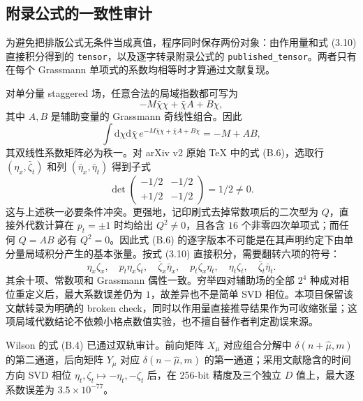 \documentclass[UTF8,11pt]{ctexart}
\newcommand{\dd}{\mathrm{d}}
\begin{document}
\subsection{附录公式的一致性审计}
为避免把排版公式无条件当成真值，程序同时保存两份对象：由作用量和式 (3.10) 直接积分得到的 \texttt{tensor}，以及逐字转录附录公式的 \texttt{published\_tensor}。两者只有在每个 Grassmann 单项式的系数均相等时才算通过文献复现。

对单分量 staggered 场，任意合法的局域指数都可写为
\begin{equation}
 -M\bar\chi\chi+\bar\chi A+B\chi,
\end{equation}
其中 $A,B$ 是辅助变量的 Grassmann 奇线性组合。因此
\begin{equation}
 \int\dd\chi\dd\bar\chi\,
 e^{-M\bar\chi\chi+\bar\chi A+B\chi}=-M+AB,
\end{equation}
其双线性系数矩阵必为秩一。对 arXiv v2 原始 TeX 中的式 (B.6)，选取行 $(\eta_x,\bar\zeta_t)$ 和列 $(\bar\eta_x,\bar\eta_t)$ 得到子式
\begin{equation}
 \det\begin{pmatrix}-1/2&-1/2\\+1/2&-1/2\end{pmatrix}=1/2\ne0.
\end{equation}
这与上述秩一必要条件冲突。更强地，记印刷式去掉常数项后的二次型为 $Q$，直接外代数计算在 $p_t=\pm1$ 时均给出 $Q^2\ne0$，且各含 $16$ 个非零四次单项式；而任何 $Q=AB$ 必有 $Q^2=0$。因此式 (B.6) 的逐字版本不可能是在其声明约定下由单分量局域积分产生的基本张量。按式 (3.10) 直接积分，需要翻转六项的符号：
\begin{equation}
 \eta_x\zeta_x,\quad p_t\eta_x\zeta_t,\quad
 \bar\zeta_x\bar\eta_x,\quad p_t\zeta_x\eta_t,\quad
 \eta_t\zeta_t,\quad \bar\zeta_t\bar\eta_t.
\end{equation}
其余十项、常数项和 Grassmann 偶性一致。穷举四对辅助场的全部 $2^4$ 种成对相位重定义后，最大系数误差仍为 $1$，故差异也不是简单 SVD 相位。本项目保留该文献转录为明确的 broken check，同时以作用量直接推导结果作为可收缩张量；这项局域代数结论不依赖小格点数值实验，也不擅自替作者判定勘误来源。

Wilson 的式 (B.4) 已通过双轨审计。前向矩阵 $X_\mu$ 对应组合分解中 $\delta(n+\hat\mu,m)$ 的第二通道，后向矩阵 $Y_\mu$ 对应 $\delta(n-\hat\mu,m)$ 的第一通道；采用文献隐含的时间方向 SVD 相位 $\eta_t,\zeta_t\mapsto-\eta_t,-\zeta_t$ 后，在 256-bit 精度及三个独立 $D$ 值上，最大逐系数误差为 $3.5\times10^{-77}$。
\end{document}
